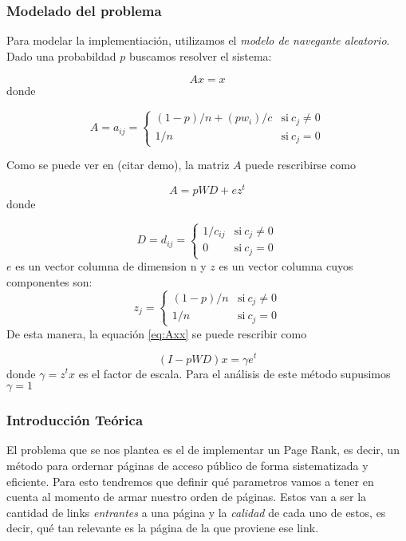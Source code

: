 \subsubsection*{Modelado del problema}
Para modelar la implementiaci\'on, utilizamos el \textit{modelo de navegante aleatorio}\cite{navegante}.
Dado una probabildad $p$ buscamos resolver el sistema:

\begin{equation}\label{eq:Axx}
    Ax = x
\end{equation}
donde 

\begin{equation}
 A = a_{ij} = \left\{
    \begin{array}{ll}
	 (1-p)/n + (p w_{i})/c & \mathrm{si\ } c_j\not=0\\
	 1/n & \mathrm{si\ } c_j=0
	 \end{array}
   \right.
\end{equation}

Como se puede ver en (citar demo), la matriz $A$ puede rescribirse como

\begin{equation}
    A = p WD + ez^{t}
\end{equation}
donde

\[
 D = d_{ij} = \left\{
    \begin{array}{ll}
	 1/c_{ij} & \mathrm{si\ } c_j\not=0\\
	 0 & \mathrm{si\ } c_j=0
	 \end{array}
   \right.
\]   
$e$ es un vector columna de dimension n y $z$ es un vector columna cuyos componentes son:
\[   
  z_{j} = \left\{
    \begin{array}{ll}
	 (1-p)/n & \mathrm{si\ } c_j\not=0\\
	 1/n & \mathrm{si\ } c_j=0
	 \end{array}
   \right.
\]  
De esta manera, la equaci\'on \ref{eq:Axx} se puede rescribir como

\begin{equation}\label{ipwd}
    (I - pWD)x = \gamma e^t 
\end{equation}
donde $\gamma = z^tx$ es el factor de escala. Para el an\'alisis de este m\'etodo supusimos
$\gamma = 1$


\subsubsection*{Introducción Teórica}

\par El problema que se nos plantea es el de implementar un Page Rank, es decir, 
un método para ordernar páginas de acceso público de forma sistematizada y eficiente. 
Para esto tendremos que definir qu\'e parametros vamos a tener en cuenta al momento de 
armar nuestro orden de páginas. Estos van a ser la cantidad de links \textit{entrantes} 
a una página y la \textit{calidad} de cada uno de estos, es decir, qu\'e tan relevante 
es la página de la que proviene ese link.\newline


